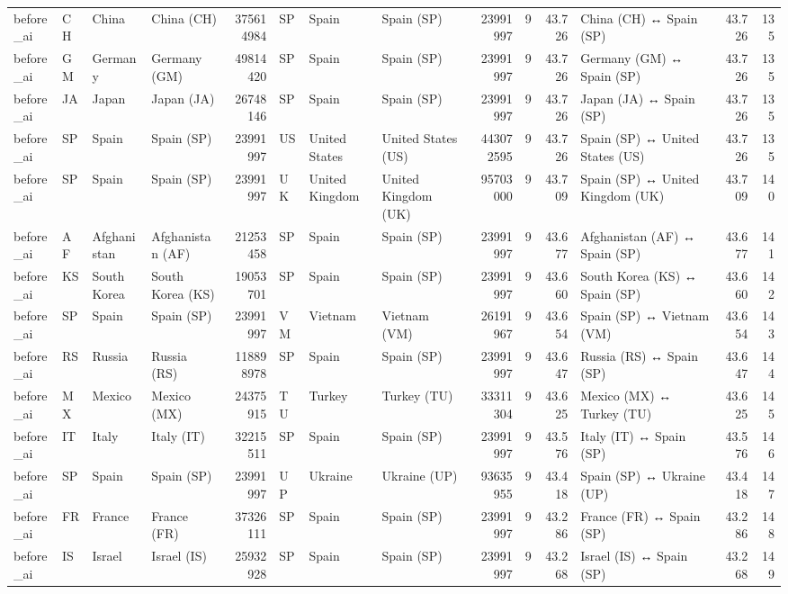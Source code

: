 \begin{tabular}{llllrlllrrrlrr}
before\_ai & CH & China & China (CH) & 375614984 & SP & Spain & Spain (SP) & 23991997 & 9 & 43.726 & China (CH) ↔ Spain (SP) & 43.726 & 135 \\
before\_ai & GM & Germany & Germany (GM) & 49814420 & SP & Spain & Spain (SP) & 23991997 & 9 & 43.726 & Germany (GM) ↔ Spain (SP) & 43.726 & 135 \\
before\_ai & JA & Japan & Japan (JA) & 26748146 & SP & Spain & Spain (SP) & 23991997 & 9 & 43.726 & Japan (JA) ↔ Spain (SP) & 43.726 & 135 \\
before\_ai & SP & Spain & Spain (SP) & 23991997 & US & United States & United States (US) & 443072595 & 9 & 43.726 & Spain (SP) ↔ United States (US) & 43.726 & 135 \\
before\_ai & SP & Spain & Spain (SP) & 23991997 & UK & United Kingdom & United Kingdom (UK) & 95703000 & 9 & 43.709 & Spain (SP) ↔ United Kingdom (UK) & 43.709 & 140 \\
before\_ai & AF & Afghanistan & Afghanistan (AF) & 21253458 & SP & Spain & Spain (SP) & 23991997 & 9 & 43.677 & Afghanistan (AF) ↔ Spain (SP) & 43.677 & 141 \\
before\_ai & KS & South Korea & South Korea (KS) & 19053701 & SP & Spain & Spain (SP) & 23991997 & 9 & 43.660 & South Korea (KS) ↔ Spain (SP) & 43.660 & 142 \\
before\_ai & SP & Spain & Spain (SP) & 23991997 & VM & Vietnam & Vietnam (VM) & 26191967 & 9 & 43.654 & Spain (SP) ↔ Vietnam (VM) & 43.654 & 143 \\
before\_ai & RS & Russia & Russia (RS) & 118898978 & SP & Spain & Spain (SP) & 23991997 & 9 & 43.647 & Russia (RS) ↔ Spain (SP) & 43.647 & 144 \\
before\_ai & MX & Mexico & Mexico (MX) & 24375915 & TU & Turkey & Turkey (TU) & 33311304 & 9 & 43.625 & Mexico (MX) ↔ Turkey (TU) & 43.625 & 145 \\
before\_ai & IT & Italy & Italy (IT) & 32215511 & SP & Spain & Spain (SP) & 23991997 & 9 & 43.576 & Italy (IT) ↔ Spain (SP) & 43.576 & 146 \\
before\_ai & SP & Spain & Spain (SP) & 23991997 & UP & Ukraine & Ukraine (UP) & 93635955 & 9 & 43.418 & Spain (SP) ↔ Ukraine (UP) & 43.418 & 147 \\
before\_ai & FR & France & France (FR) & 37326111 & SP & Spain & Spain (SP) & 23991997 & 9 & 43.286 & France (FR) ↔ Spain (SP) & 43.286 & 148 \\
before\_ai & IS & Israel & Israel (IS) & 25932928 & SP & Spain & Spain (SP) & 23991997 & 9 & 43.268 & Israel (IS) ↔ Spain (SP) & 43.268 & 149 \\

\end{tabular}
